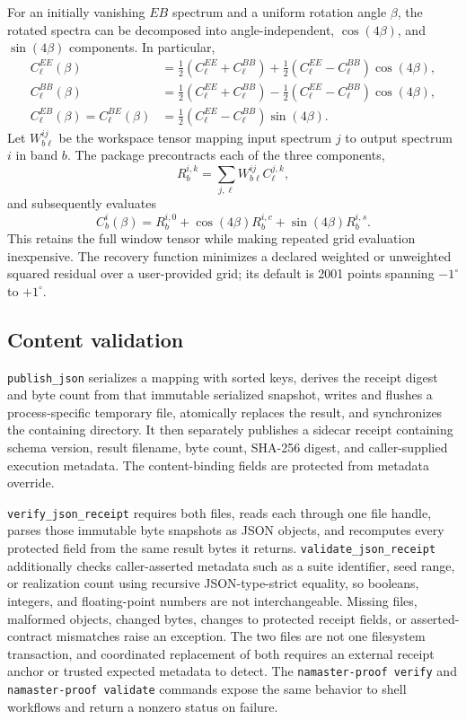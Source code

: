 For an initially vanishing \(EB\) spectrum and a uniform rotation angle
\(\beta\), the rotated spectra can be decomposed into angle-independent,
\(\cos(4\beta)\), and \(\sin(4\beta)\) components.  In particular,
\begin{align}
 C_\ell^{EE}(\beta)
   &= \tfrac12(C_\ell^{EE}+C_\ell^{BB})
    + \tfrac12(C_\ell^{EE}-C_\ell^{BB})\cos(4\beta),\\
 C_\ell^{BB}(\beta)
   &= \tfrac12(C_\ell^{EE}+C_\ell^{BB})
    - \tfrac12(C_\ell^{EE}-C_\ell^{BB})\cos(4\beta),\\
 C_\ell^{EB}(\beta)=C_\ell^{BE}(\beta)
   &= \tfrac12(C_\ell^{EE}-C_\ell^{BB})\sin(4\beta).
\end{align}
Let \(W_{b\ell}^{ij}\) be the workspace tensor mapping input spectrum \(j\)
to output spectrum \(i\) in band \(b\).  The package precontracts each of the
three components,
\begin{equation}
 R_{b}^{i,k}=\sum_{j,\ell}W_{b\ell}^{ij}C_\ell^{j,k},
\end{equation}
and subsequently evaluates
\begin{equation}
 C_b^i(\beta)=R_b^{i,0}
 +\cos(4\beta)R_b^{i,c}+\sin(4\beta)R_b^{i,s}.
\end{equation}
This retains the full window tensor while making repeated grid evaluation
inexpensive.  The recovery function minimizes a declared weighted or
unweighted squared residual over a user-provided grid; its default is 2001
points spanning \(-1^\circ\) to \(+1^\circ\).

\subsection*{Content validation}

\texttt{publish\_json} serializes a mapping with sorted keys, derives the
receipt digest and byte count from that immutable serialized snapshot, writes and
flushes a process-specific temporary file, atomically replaces the result,
and synchronizes the containing directory.  It then separately publishes a sidecar receipt
containing schema version, result filename, byte count, SHA-256 digest, and
caller-supplied execution metadata.  The content-binding fields are protected
from metadata override.

\texttt{verify\_json\_receipt} requires both files, reads each through one file
handle, parses those immutable byte snapshots as JSON objects, and recomputes
every protected field from the same result bytes it returns.
\texttt{validate\_json\_receipt}
additionally checks caller-asserted metadata such as a suite identifier, seed range,
or realization count using recursive JSON-type-strict equality, so booleans,
integers, and floating-point numbers are not interchangeable. Missing files,
malformed objects, changed bytes,
changes to protected receipt fields, or asserted-contract mismatches raise an exception. The two
files are not one filesystem transaction, and coordinated replacement of both
requires an external receipt anchor or trusted expected metadata to detect. The
\texttt{namaster-proof verify} and \texttt{namaster-proof validate} commands
expose the same behavior to shell workflows and return a nonzero status on
failure.

